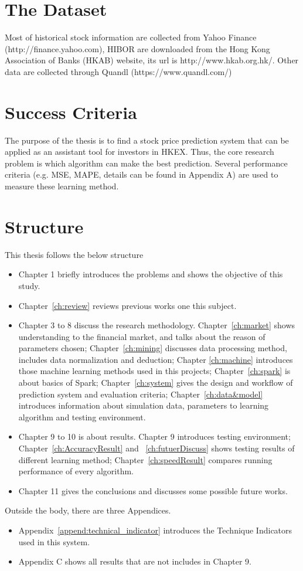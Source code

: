 \section{The Dataset}
Most of historical stock information are collected from Yahoo Finance (http://finance.yahoo.com), HIBOR are downloaded from the Hong Kong Association of Banks (HKAB) website, its url is http://www.hkab.org.hk/. Other data are collected through Quandl (https://www.quandl.com/)

\section{Success Criteria}
The purpose of the thesis is to find a stock price prediction system that can be applied as an assistant tool for investors in HKEX. Thus, the core research problem is which algorithm can make the best prediction. Several performance criteria (e.g. MSE, MAPE, details can be found in Appendix A) are used to measure these learning method.


\section{Structure}


This thesis follows the below structure\par
\begin{itemize}
	\item Chapter 1 briefly introduces the problems and shows the objective of this study.
	\item Chapter~\ref{ch:review} reviews previous works one this subject.
	\item Chapter 3 to 8 discuss the research methodology. Chapter~\ref{ch:market} shows understanding to the financial market, and talks about the reason of parameters chosen; Chapter~\ref{ch:mining} discusses data processing method, includes data normalization and deduction; Chapter \ref{ch:machine} introduces those machine learning methods used in this projects; Chapter~\ref{ch:spark} is about basics of Spark; Chapter~\ref{ch:system} gives the design and workflow of prediction system and evaluation criteria; Chapter~\ref{ch:data&model} introduces information about simulation data, parameters to learning algorithm and testing environment.
	\item Chapter 9 to 10 is about results. Chapter 9 introduces testing environment; Chapter~\ref{ch:AccuracyResult} and ~\ref{ch:futuerDiscuss} shows testing results of different learning method; Chapter~\ref{ch:speedResult} compares running performance of every algorithm.
	\item Chapter 11 gives the conclusions and discusses some possible future works.
\end{itemize}

Outside the body, there are three Appendices.
\begin{itemize}
	\item Appendix~\ref{append:technical_indicator} introduces the Technique Indicators used in this system.
	\item Appendix C shows all results that are not includes in Chapter 9.
\end{itemize}




